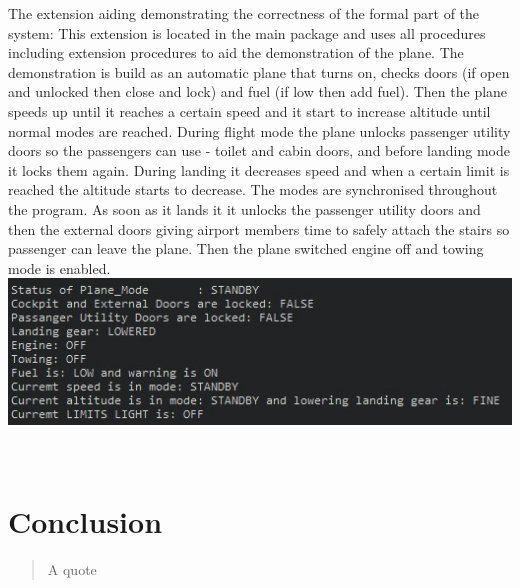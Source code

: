 \documentclass{llncs}
\begin{document}
The extension aiding demonstrating the correctness of the formal part of the system:
This extension is located in the main package and uses all procedures including extension procedures to aid the demonstration of the plane. The demonstration is build as an automatic plane that turns on, checks doors (if open and unlocked then close and lock) and fuel (if low then add fuel). Then the plane speeds up until it reaches a certain speed and it start to increase altitude until normal modes are reached. During flight mode the plane unlocks passenger utility doors so the passengers can use - toilet and cabin doors, and before landing mode it locks them again. During landing it decreases speed and when a certain limit is reached the altitude starts to decrease. The modes are synchronised throughout the program. As soon as it lands it it unlocks the passenger utility doors and then the external doors  giving airport members time to safely attach the stairs so passenger can leave the plane. Then the plane switched engine off and towing mode is enabled. 
\\
\includegraphics{planeimg.jpg}

\\
\section{Conclusion}

\begin{quote} A quote
\end{quote}
\end{document}
